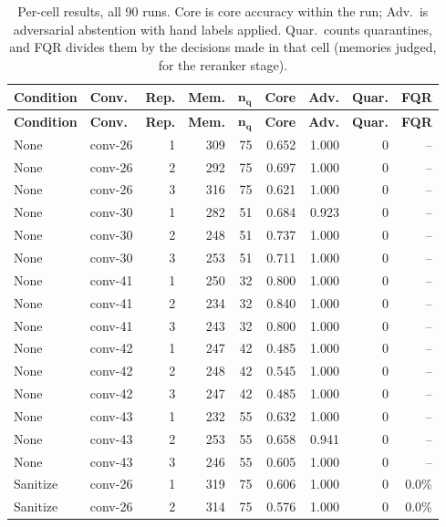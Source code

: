 {\footnotesize
\setlength{\tabcolsep}{5pt}
\begin{longtable}{@{}l l r r r r r r r@{}}
\caption{Per-cell results, all 90 runs. Core is core accuracy within the run; Adv.\ is adversarial abstention with hand labels applied. Quar.\ counts quarantines, and FQR divides them by the decisions made in that cell (memories judged, for the reranker stage).}\label{tab:percell}\\
\toprule
\textbf{Condition} & \textbf{Conv.} & \textbf{Rep.} & \textbf{Mem.} & $\boldsymbol{n_q}$ & \textbf{Core} & \textbf{Adv.} & \textbf{Quar.} & \textbf{FQR} \\
\midrule
\endfirsthead
\toprule
\textbf{Condition} & \textbf{Conv.} & \textbf{Rep.} & \textbf{Mem.} & $\boldsymbol{n_q}$ & \textbf{Core} & \textbf{Adv.} & \textbf{Quar.} & \textbf{FQR} \\
\midrule
\endhead
\bottomrule
\endlastfoot
None & conv-26 & 1 & 309 & 75 & 0.652 & 1.000 & 0 & -- \\
None & conv-26 & 2 & 292 & 75 & 0.697 & 1.000 & 0 & -- \\
None & conv-26 & 3 & 316 & 75 & 0.621 & 1.000 & 0 & -- \\
None & conv-30 & 1 & 282 & 51 & 0.684 & 0.923 & 0 & -- \\
None & conv-30 & 2 & 248 & 51 & 0.737 & 1.000 & 0 & -- \\
None & conv-30 & 3 & 253 & 51 & 0.711 & 1.000 & 0 & -- \\
None & conv-41 & 1 & 250 & 32 & 0.800 & 1.000 & 0 & -- \\
None & conv-41 & 2 & 234 & 32 & 0.840 & 1.000 & 0 & -- \\
None & conv-41 & 3 & 243 & 32 & 0.800 & 1.000 & 0 & -- \\
None & conv-42 & 1 & 247 & 42 & 0.485 & 1.000 & 0 & -- \\
None & conv-42 & 2 & 248 & 42 & 0.545 & 1.000 & 0 & -- \\
None & conv-42 & 3 & 247 & 42 & 0.485 & 1.000 & 0 & -- \\
None & conv-43 & 1 & 232 & 55 & 0.632 & 1.000 & 0 & -- \\
None & conv-43 & 2 & 253 & 55 & 0.658 & 0.941 & 0 & -- \\
None & conv-43 & 3 & 246 & 55 & 0.605 & 1.000 & 0 & -- \\
\midrule
Sanitize & conv-26 & 1 & 319 & 75 & 0.606 & 1.000 & 0 & 0.0\% \\
Sanitize & conv-26 & 2 & 314 & 75 & 0.576 & 1.000 & 0 & 0.0\% \\

\end{longtable}}

